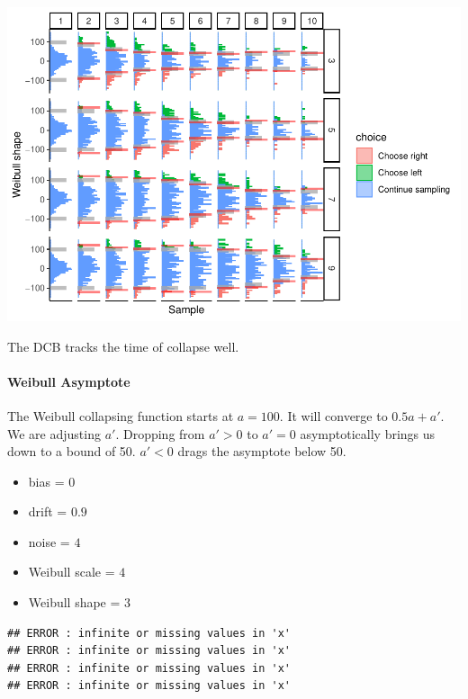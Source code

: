 \documentclass[
]{book}
\providecommand{\tightlist}{%
  \setlength{\itemsep}{0pt}\setlength{\parskip}{0pt}}
\begin{document}
\includegraphics{LateNightBayes_files/figure-latex/unnamed-chunk-13-1.pdf}

The DCB tracks the time of collapse well.

\hypertarget{weibull-asymptote}{%
\paragraph*{Weibull Asymptote}\label{weibull-asymptote}}

The Weibull collapsing function starts at \(a=100\). It will converge to \(0.5a+a'\). We are adjusting \(a'\).
Dropping from \(a'>0\) to \(a'=0\) asymptotically brings us down to a bound of 50. \(a'<0\) drags the asymptote below 50.

\begin{itemize}
\tightlist
\item
  bias = \(0\)
\item
  drift = \(0.9\)
\item
  noise = \(4\)
\item
  Weibull scale = \(4\)
\item
  Weibull shape = \(3\)
\end{itemize}

\begin{verbatim}
## ERROR : infinite or missing values in 'x' 
## ERROR : infinite or missing values in 'x' 
## ERROR : infinite or missing values in 'x' 
## ERROR : infinite or missing values in 'x'
\end{verbatim}
\end{document}
